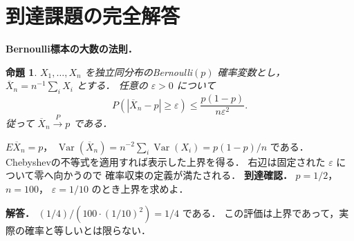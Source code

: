 \documentclass[a5paper,10pt,onecolumn]{jsarticle}
\makeatletter
\theoremstyle{mathnotetheorem}
\newtheorem{proposition}[theorem]{命題}
\renewcommand{\proofname}{証明}
\renewenvironment{proof}[1][\proofname]{%
  \par\pushQED{\qed}\normalfont\topsep4\p@\@plus2\p@\relax
  \trivlist\item[\hskip\labelsep\bfseries #1]\ignorespaces
}{\popQED\endtrivlist\@endpefalse}
\makeatother
\begin{document}
\section{到達課題の完全解答}
\noindent\textbf{Bernoulli標本の大数の法則．}
\begin{proposition}
$X_1,\dots,X_n$ を独立同分布のBernoulli$(p)$
確率変数とし，
$\overline X_n=n^{-1}\sum_iX_i$ とする．
任意の $\varepsilon>0$ について
\[
P(|\overline X_n-p|\ge\varepsilon)
\le\frac{p(1-p)}{n\varepsilon^2}.
\]
従って $\overline X_n\xrightarrow{P}p$ である．
\end{proposition}
\begin{proof}
$E\overline X_n=p$，
$\operatorname{Var}(\overline X_n)=
n^{-2}\sum_i\operatorname{Var}(X_i)
=p(1-p)/n$ である．
Chebyshevの不等式を適用すれば表示した上界を得る．
右辺は固定された $\varepsilon$ について零へ向かうので
確率収束の定義が満たされる．
\end{proof}
\noindent\textbf{到達確認．}
$p=1/2$，$n=100$，
$\varepsilon=1/10$ のとき上界を求めよ．
\par\noindent\textbf{解答．}
$(1/4)/(100\cdot(1/10)^2)=1/4$ である．
この評価は上界であって，実際の確率と等しいとは限らない．
\end{document}
